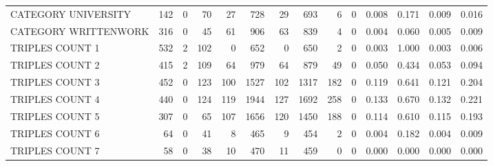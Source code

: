 \begin{tabular}{lrrrrrrrrrllll}
 CATEGORY UNIVERSITY      &             142 &             0 &              70 &              27 &             728 &   29 &  693 &    6 &    0 & 0.008 & 0.171 & 0.009 & 0.016 \\
 CATEGORY WRITTENWORK     &             316 &             0 &              45 &              61 &             906 &   63 &  839 &    4 &    0 & 0.004 & 0.060 & 0.005 & 0.009 \\
 TRIPLES COUNT 1          &             532 &             2 &             102 &               0 &             652 &    0 &  650 &    2 &    0 & 0.003 & 1.000 & 0.003 & 0.006 \\
 TRIPLES COUNT 2          &             415 &             2 &             109 &              64 &             979 &   64 &  879 &   49 &    0 & 0.050 & 0.434 & 0.053 & 0.094 \\
 TRIPLES COUNT 3          &             452 &             0 &             123 &             100 &            1527 &  102 & 1317 &  182 &    0 & 0.119 & 0.641 & 0.121 & 0.204 \\
 TRIPLES COUNT 4          &             440 &             0 &             124 &             119 &            1944 &  127 & 1692 &  258 &    0 & 0.133 & 0.670 & 0.132 & 0.221 \\
 TRIPLES COUNT 5          &             307 &             0 &              65 &             107 &            1656 &  120 & 1450 &  188 &    0 & 0.114 & 0.610 & 0.115 & 0.193 \\
 TRIPLES COUNT 6          &              64 &             0 &              41 &               8 &             465 &    9 &  454 &    2 &    0 & 0.004 & 0.182 & 0.004 & 0.009 \\
 TRIPLES COUNT 7          &              58 &             0 &              38 &              10 &             470 &   11 &  459 &    0 &    0 & 0.000 & 0.000 & 0.000 & 0.000 \\
\hline
\end{tabular}
